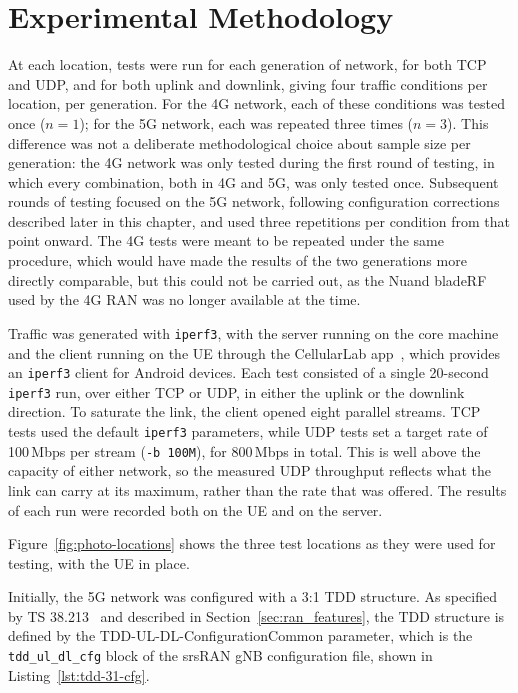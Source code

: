 \newpage

\section{Experimental Methodology}
\label{sec:experimental-methodology}
At each location, tests were run for each generation of network, for both TCP and UDP, and for both uplink and downlink, giving four traffic conditions per location, per generation. For the 4G network, each of these conditions was tested once ($n=1$); for the 5G network, each was repeated three times ($n=3$). This difference was not a deliberate methodological choice about sample size per generation: the 4G network was only tested during the first round of testing, in which every combination, both in 4G and 5G, was only tested once. Subsequent rounds of testing focused on the 5G network, following configuration corrections described later in this chapter, and used three repetitions per condition from that point onward. The 4G tests were meant to be repeated under the same procedure, which would have made the results of the two generations more directly comparable, but this could not be carried out, as the Nuand bladeRF used by the 4G \gls{RAN} was no longer available at the time.

Traffic was generated with \texttt{iperf3}, with the server running on the core machine and the client running on the \gls{UE} through the CellularLab app~\cite{cellularlab}, which provides an \texttt{iperf3} client for Android devices. Each test consisted of a single 20-second \texttt{iperf3} run, over either TCP or UDP, in either the uplink or the downlink direction. To saturate the link, the client opened eight parallel streams. TCP tests used the default \texttt{iperf3} parameters, while UDP tests set a target rate of 100\,Mbps per stream (\texttt{-b 100M}), for 800\,Mbps in total. This is well above the capacity of either network, so the measured UDP throughput reflects what the link can carry at its maximum, rather than the rate that was offered. The results of each run were recorded both on the \gls{UE} and on the server.

Figure~\ref{fig:photo-locations} shows the three test locations as they were used for testing, with the \gls{UE} in place.

Initially, the 5G network was configured with a 3:1 \gls{TDD} structure. As specified by TS 38.213~\cite{3GPP38213} and described in Section~\ref{sec:ran_features}, the \gls{TDD} structure is defined by the TDD-UL-DL-ConfigurationCommon parameter, which is the \texttt{tdd\_ul\_dl\_cfg} block of the srsRAN \gls{gNB} configuration file, shown in Listing~\ref{lst:tdd-31-cfg}.
\newpage

